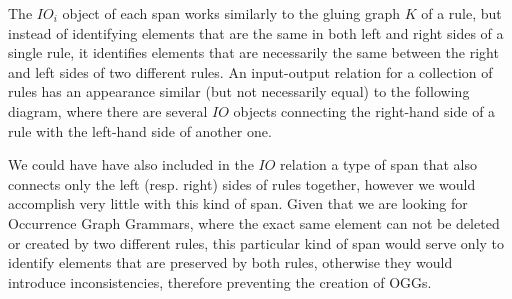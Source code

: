The $IO_i$ object of each span works similarly to the gluing graph $K$ of a rule, but instead of identifying elements that are the same in both left and right sides of a single rule, it identifies elements that are necessarily the same between the right and left sides of two different rules. An input-output relation for a collection of rules has an appearance similar (but not necessarily equal) to the following diagram, where there are several $IO$ objects connecting the right-hand side of a rule with the left-hand side of another one.



\begin{remark}We could have have also included in the $IO$ relation a type of span that also connects only the left (resp. right) sides of rules together, however we would accomplish very little with this kind of span. Given that we are looking for Occurrence Graph Grammars, where the exact same element can not be deleted or created by two different rules, this particular kind of span would serve only to identify elements that are preserved by both rules, otherwise they would introduce inconsistencies, therefore preventing the creation of OGGs.
\end{remark}

